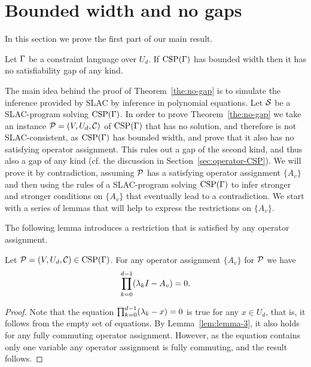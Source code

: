 \documentclass[11pt,letter]{article}
\begin{document}
 

\section{Bounded width and no gaps}\label{sec:no-gap}

In this section we prove the first part of our main result.

\begin{theorem}\label{the:no-gap}
Let $\Gamma$ be a constraint language over $U_d$. If ${\rm CSP}(\Gamma)$ has bounded
  width then it has no satisfiability gap of any kind.
\end{theorem}

The main idea behind the proof
of Theorem~\ref{the:no-gap} is to simulate the inference provided by SLAC 
by inference in polynomial equations. Let ${\mathcal S}$ be a SLAC-program solving ${\rm CSP}(\Gamma)$.
In order to prove Theorem~\ref{the:no-gap} we take an instance ${\mathcal P}=(V,U_d,{\mathcal C})$
of ${\rm CSP}(\Gamma)$ that has no solution, and therefore is not SLAC-consistent, as
${\rm CSP}(\Gamma)$ has bounded width, and prove that it also has no satisfying operator
assignment. This rules out a gap of the second kind, and thus also a gap of any
kind (cf. the discussion in Section~\ref{sec:operator-CSP}). We will prove it by contradiction, assuming ${\mathcal P}$ has a satisfying operator assignment $\{A_v\}$ and then using the rules of a SLAC-program solving ${\rm CSP}(\Gamma)$ to infer stronger and stronger conditions on $\{A_v\}$ that eventually lead to a contradiction. We start with a series of lemmas that will help to express the restrictions on $\{A_v\}$.

The following lemma introduces a restriction that is satisfied by any operator assignment. 

\begin{lemma}\label{lem:whole-domain-poly}
Let ${\mathcal P}=(V,U_d,{\mathcal C})\in{\rm CSP}(\Gamma)$. For any operator assignment $\{A_v\}$
for ${\mathcal P}$ we have
\[
\prod_{k=0}^{d-1}(\lambda_k I-A_v)=0.
\]
\end{lemma}
\begin{proof}
Note that the equation $\prod_{k=0}^{d-1}(\lambda_k-x)=0$ is true for any
$x\in U_d$, that is, it follows from the empty set of equations. By
Lemma~\ref{lem:lemma-3}, it also holds for any fully commuting operator 
assignment. However, as the equation contains only one variable any 
operator assignment is fully commuting, and the result follows.
\end{proof}
\end{document}
